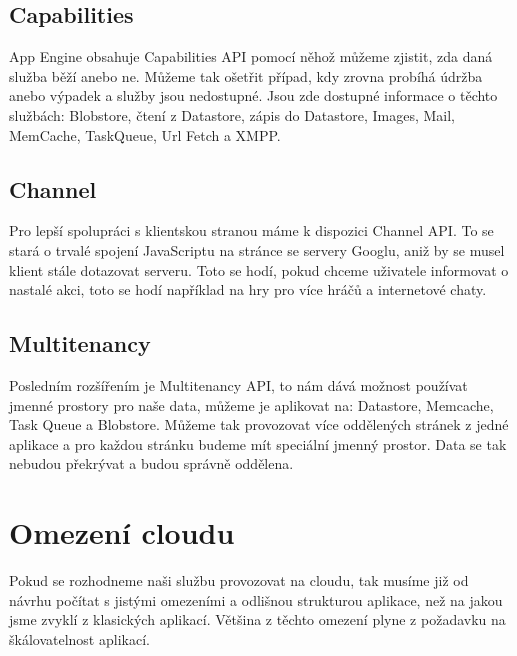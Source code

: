 \subsection{Capabilities}
App Engine obsahuje Capabilities API pomocí něhož můžeme zjistit, zda daná služba běží anebo ne. Můžeme tak ošetřit případ, kdy zrovna probíhá údržba anebo výpadek a služby jsou nedostupné. Jsou zde dostupné informace o těchto službách: Blobstore, čtení z Datastore, zápis do Datastore, Images, Mail, MemCache, TaskQueue, Url Fetch a XMPP.

\subsection{Channel}
Pro lepší spolupráci s klientskou stranou máme k dispozici Channel API. To se stará o trvalé spojení JavaScriptu na stránce se servery Googlu, aniž by se musel klient stále dotazovat serveru. Toto se hodí, pokud chceme uživatele informovat o nastalé akci, toto se hodí například na hry pro více hráčů a internetové chaty.

\subsection{Multitenancy}
Posledním rozšířením je Multitenancy API, to nám dává možnost používat jmenné prostory pro naše data, můžeme je aplikovat na: Datastore, Memcache, Task Queue a Blobstore. Můžeme tak provozovat více oddělených stránek z jedné aplikace a pro každou stránku budeme mít speciální jmenný prostor. Data se tak nebudou překrývat a budou správně oddělena.

\section{Omezení cloudu}
Pokud se rozhodneme naši službu provozovat na cloudu, tak musíme již od návrhu počítat s jistými omezeními a odlišnou strukturou aplikace, než na jakou jsme zvyklí z klasických aplikací. Většina z těchto omezení plyne z požadavku na škálovatelnost aplikací.

